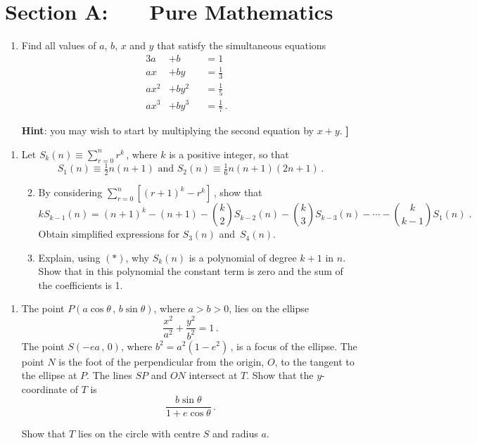 \documentclass[a4, 11pt]{report}
\newlength{\qspace}
\newcounter{qnumber}
\newenvironment{question}%
 {\vspace{\qspace}
  \begin{enumerate}[\bfseries 1\quad][10]%
    \setcounter{enumi}{\value{qnumber}}%
    \item%
 }
{
  \end{enumerate}
  \filbreak
  \stepcounter{qnumber}
 }
\newenvironment{questionparts}[1][1]%
 {
  \begin{enumerate}[\bfseries (i)]%
    \setcounter{enumii}{#1}
    \addtocounter{enumii}{-1}
    \setlength{\itemsep}{5mm}
    \setlength{\parskip}{8pt}
 }
 {
  \end{enumerate}
 }
\begin{document}
\setcounter{page}{2}

 
\section*{Section A: \ \ \ Pure Mathematics}

\begin{question}
Find all values of $a$, $b$, $x$ and $y$ that satisfy the
simultaneous
equations
\begin{alignat*}{3}
a&+b &  &=1 &\\
ax&+by & &= \tfrac13& \\
ax^2&+by^2& &=\tfrac15& \\
ax^3 &+by^3& &=\tfrac17\,.&
\end{alignat*}


\noindent{\bf [} {\bf Hint}: you may wish to start by multiplying the second
equation by $x+y$. {\bf ]}
\end{question}

\begin{question}
Let $S_k(n) \equiv \sum\limits_{r=0}^n r^k\,$, where $k$ is a
positive
integer, so that
\[
S_1(n) \equiv  \tfrac12 n(n+1)
\text{ \ \ \ \ and \ \ \ \ }
S_2(n) \equiv \tfrac16 n(n+1)(2n+1)\,.
\]

\begin{questionparts}
\item
By considering $\sum\limits_{r=0}^n \left[ (r+1)^k-r^k\right]\, $,
show that 
\[
kS_{k-1}(n)=(n+1)^k -(n+1) -  
\binom{k}{2} S_{k-2}(n) 
- \binom {k}{3} S_{k-3}(n) - \cdots
- \binom{k}{k-1} S_{1}(n)
\;.
\tag{$*$}
\] 
Obtain simplified expressions for $S_3(n)$ and~$S_4(n)$.

\item
Explain, using $(*)$, why $S_k(n)$ is a polynomial of degree $k+1$ in
$n$.   Show that in this polynomial the constant term is zero and 
the sum of the coefficients is 1.
\end{questionparts}
\end{question}

\begin{question}
The point $P(a\cos\theta\,,\, b\sin\theta)$, where $a>b>0$, lies
on the ellipse 
\[\dfrac {x^2}{a^2} + \dfrac {y^2}{b^2}=1\,.\]
The point $S(-ea\,,\,0)$, where $b^2=a^2(1-e^2)\,$, is a focus of
the ellipse. The point $N$ is the foot of the perpendicular from 
the origin, $O$, to the tangent to the ellipse at $P$. The lines
$SP$ and $ON$ intersect at $T$. Show that the $y$-coordinate of 
$T$ is 
\[\dfrac{b\sin\theta}{1+e\cos\theta}\,.\]

Show that $T$ lies on the circle with centre $S$ and radius $a$.



\end{question}
\end{document}
